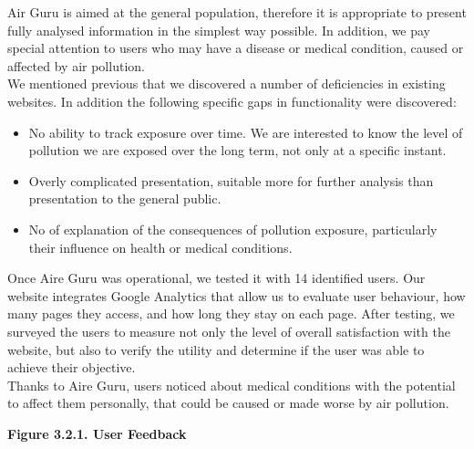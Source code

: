 Air Guru is aimed at the general population, therefore it is appropriate to present fully analysed information in the simplest way possible.
In addition, we pay special attention to users who may have a
disease or medical condition, caused or affected by air pollution.\\

We mentioned previous that we discovered a number of deficiencies in existing websites. In addition the following specific gaps in functionality were discovered:

\begin{itemize}
    \item No ability to track exposure over time. We are interested to know the level of pollution we are exposed over the long term, not only at a specific instant.
    \item Overly complicated presentation, suitable more for further analysis than presentation to the general public.
    \item No of explanation of the consequences of pollution exposure, particularly their influence on health or medical conditions.
\end{itemize}

Once Aire Guru was operational, we tested it with 14 identified users. Our website integrates Google Analytics that allow us to evaluate
user behaviour, how many pages they access, and how long they stay on each page.
After testing, we surveyed the users to measure not only the level of overall satisfaction with the website,
but also to verify the utility and determine if the user was able to achieve their objective.\\

Thanks to Aire Guru, users noticed about medical conditions with the potential to affect them personally, that could be caused or made worse by air pollution.\\

\begin{center}
    \bf{Figure 3.2.1. User Feedback}
\end{center}